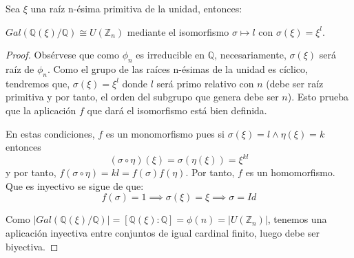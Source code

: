 \begin{proposition}
Sea $\xi$ una raíz n-ésima primitiva de la unidad, entonces:

$Gal(\mathbb{Q}(\xi)/\mathbb{Q}) \cong U(\mathbb{Z}_n)$ mediante el isomorfismo $\sigma \mapsto l$ con $\sigma(\xi) = \xi^l$. 
\end{proposition}
\begin{proof}
Obsérvese que como $\phi_n$ es irreducible en $\mathbb{Q}$, necesariamente, $\sigma(\xi)$ será raíz de $\phi_n$. Como el grupo de las raíces n-ésimas de la unidad es cíclico, tendremos que, $\sigma(\xi) = \xi^l$ donde $l$ será primo relativo con $n$ (debe ser raíz primitiva y por tanto, el orden del subgrupo que genera debe ser $n$). Esto prueba que la aplicación $f$ que dará el isomorfismo está bien definida. 

En estas condiciones, $f$ es un monomorfismo pues si $\sigma(\xi) = l \land \eta(\xi) = k$ entonces $$(\sigma \circ \eta)(\xi) = \sigma(\eta(\xi)) = \xi^{kl}$$ y por tanto, $f(\sigma \circ \eta) = kl = f(\sigma) f(\eta)$. Por tanto, $f$ es un homomorfismo. Que es inyectivo se sigue de que: $$f(\sigma) = 1 \implies \sigma(\xi) = \xi \implies \sigma = Id$$

Como $|Gal(\mathbb{Q}(\xi)/\mathbb{Q})| = [\mathbb{Q}(\xi):\mathbb{Q}] = \phi(n) = |U(\mathbb{Z}_n)|$, tenemos una aplicación inyectiva entre conjuntos de igual cardinal finito, luego debe ser biyectiva. 
\end{proof}








